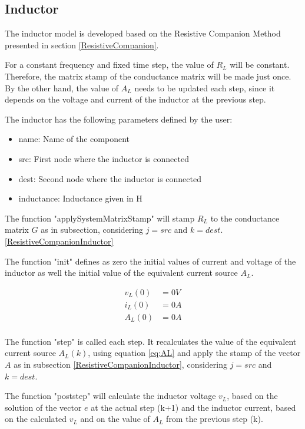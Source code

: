 \subsection{Inductor}

The inductor model is developed based on the Resistive Companion Method presented in section \ref{ResistiveCompanion}.

For a constant frequency and fixed time step, the value of $R_L$ will be constant. Therefore, the matrix stamp of the conductance matrix will be made just once. By the other hand, the value of $A_L$ needs to be updated each step, since it depends on the voltage and current of the inductor at the previous step.

The inductor has the following parameters defined by the user:

\begin{itemize}
\item name: Name of the component
\item src: First node where the inductor is connected
\item dest: Second node where the inductor is connected
\item inductance: Inductance given in H
\end{itemize}

The function "applySystemMatrixStamp" will stamp $R_L$ to the conductance matrix $G$ as in subsection, considering $j=src$ and $k=dest$. \ref{ResistiveCompanionInductor}

The function "init" defines as zero the initial values of current and voltage of the inductor as well the initial value of the equivalent current source $A_L$.

\begin{align*}
v_L(0)&=0V \\
i_L(0)&=0A \\
A_L(0)&=0A \\
\end{align*}

The function "step" is called each step. It recalculates the value of the equivalent current source $A_L(k)$, using equation \ref{eq:AL} and apply the stamp of the vector $A$ as in subsection \ref{ResistiveCompanionInductor}, considering $j=src$ and $k=dest$.

The function "poststep" will calculate the inductor voltage $v_L$, based on the solution of the vector $e$ at the actual step (k+1) and the inductor current, based on the calculated $v_L$ and on the value of $A_L$ from the previous step (k).

